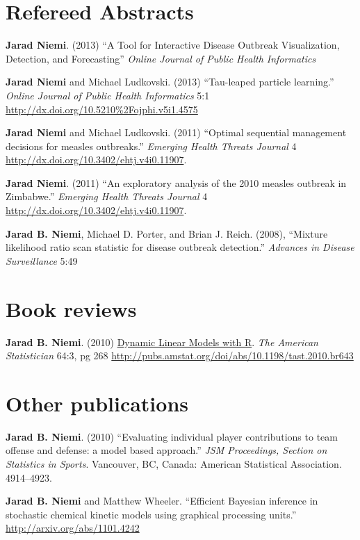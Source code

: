 \documentclass[overlapped,line]{res}
\begin{document}
\begin{resume}
\section{\bf Refereed Abstracts}

{\bf Jarad Niemi}. (2013) ``A Tool for Interactive Disease Outbreak Visualization, Detection, and Forecasting'' \emph{Online Journal of Public Health Informatics}

{\bf Jarad Niemi} and Michael Ludkovski. (2013) ``Tau-leaped particle learning.'' \emph{Online Journal of Public Health Informatics} 5:1 \url{http://dx.doi.org/10.5210%2Fojphi.v5i1.4575}

{\bf Jarad Niemi} and Michael Ludkovski. (2011) ``Optimal sequential management decisions for measles outbreaks.'' \emph{Emerging Health Threats Journal} 4 \url{http://dx.doi.org/10.3402/ehtj.v4i0.11907}.

{\bf Jarad Niemi}. (2011) ``An exploratory analysis of the 2010 measles outbreak in Zimbabwe.'' \emph{Emerging Health Threats Journal} 4 \url{http://dx.doi.org/10.3402/ehtj.v4i0.11907}.

{\bf Jarad B. Niemi}, Michael D. Porter, and Brian J. Reich. (2008), ``Mixture likelihood ratio scan statistic for disease outbreak detection.'' \emph{Advances in Disease Surveillance} 5:49

\section{\bf Book reviews}

{\bf Jarad B. Niemi}. (2010) \underline{Dynamic Linear Models with R}. \emph{The American Statistician} 64:3, pg 268 \url{http://pubs.amstat.org/doi/abs/10.1198/tast.2010.br643}

\section{\bf Other publications}

{\bf Jarad B. Niemi}. (2010) ``Evaluating individual player contributions to team offense and defense: a model based approach.'' \emph{JSM Proceedings, Section on Statistics in Sports}. Vancouver, BC, Canada: American Statistical Association. 4914--4923.

{\bf Jarad B. Niemi} and Matthew Wheeler. ``Efficient Bayesian inference in stochastic chemical kinetic models using graphical processing units.'' \url{http://arxiv.org/abs/1101.4242}


\end{resume}
\end{document}
